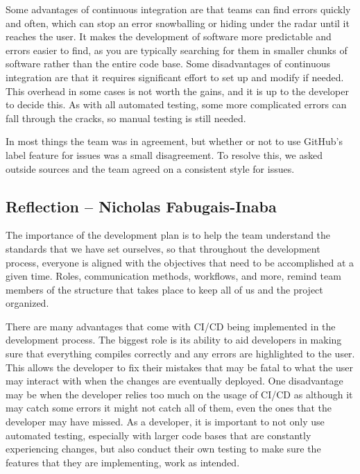 \documentclass{article}
\begin{document}
Some advantages of continuous integration are that teams can find errors
quickly and often, which can stop an error snowballing or hiding under the
radar until it reaches the user. It makes the development of software more
predictable and errors easier to find, as you are typically searching for
them in smaller chunks of software rather than the entire code base.
Some disadvantages of continuous integration are that it requires significant
effort to set up and modify if needed. This overhead in some cases is not
worth the gains, and it is up to the developer to decide this. As with all
automated testing, some more complicated errors can fall through the cracks,
so manual testing is still needed. \newline

In most things the team was in agreement, but whether or not to use GitHub's
label feature for issues was a small disagreement. To resolve this, we asked
outside sources and the team agreed on a consistent style for issues.

\subsection*{Reflection -- Nicholas Fabugais-Inaba}

The importance of the development plan is to help the team understand the
standards that we have set ourselves, so that throughout the development
process, everyone is aligned with the objectives that need to be
accomplished at a given time. Roles, communication methods, workflows,
and more, remind team members of the structure that takes place to
keep all of us and the project organized. \newline

There are many advantages that come with CI/CD being implemented in
the development process. The biggest role is its ability to aid developers
in making sure that everything compiles correctly and any errors are
highlighted to the user. This allows the developer to fix their mistakes
that may be fatal to what the user may interact with when the changes are
eventually deployed. One disadvantage may be when the developer relies
too much on the usage of CI/CD as although it may catch some errors
it might not catch all of them, even the ones that the developer may have
missed. As a developer, it is important to not only use automated testing,
especially with larger code bases that are constantly experiencing changes,
but also conduct their own testing to make sure the features that they are
implementing, work as intended. \newline
\end{document}
